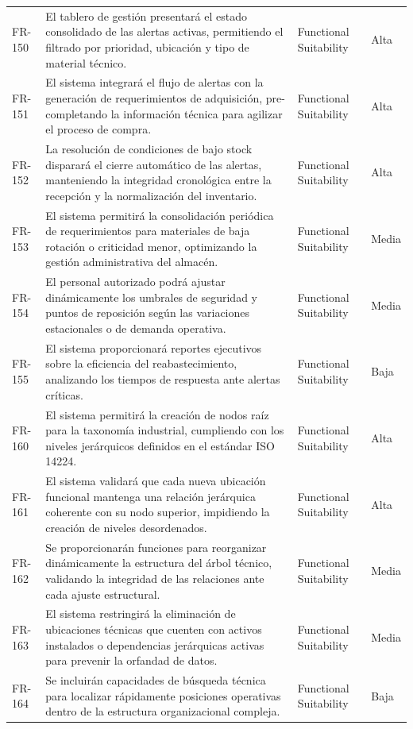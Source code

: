 \begin{longtable}{>{\raggedright\arraybackslash}p{} >{\raggedright\arraybackslash}p{} >{\raggedright\arraybackslash}p{} >{\raggedright\arraybackslash}p{}}
FR-150 & El tablero de gestión presentará el estado consolidado de las alertas activas, permitiendo el filtrado por prioridad, ubicación y tipo de material técnico. & Functional Suitability & Alta \\
FR-151 & El sistema integrará el flujo de alertas con la generación de requerimientos de adquisición, pre-completando la información técnica para agilizar el proceso de compra. & Functional Suitability & Alta \\
FR-152 & La resolución de condiciones de bajo stock disparará el cierre automático de las alertas, manteniendo la integridad cronológica entre la recepción y la normalización del inventario. & Functional Suitability & Alta \\
FR-153 & El sistema permitirá la consolidación periódica de requerimientos para materiales de baja rotación o criticidad menor, optimizando la gestión administrativa del almacén. & Functional Suitability & Media \\
FR-154 & El personal autorizado podrá ajustar dinámicamente los umbrales de seguridad y puntos de reposición según las variaciones estacionales o de demanda operativa. & Functional Suitability & Media \\
FR-155 & El sistema proporcionará reportes ejecutivos sobre la eficiencia del reabastecimiento, analizando los tiempos de respuesta ante alertas críticas. & Functional Suitability & Baja \\
FR-160 & El sistema permitirá la creación de nodos raíz para la taxonomía industrial, cumpliendo con los niveles jerárquicos definidos en el estándar ISO 14224. & Functional Suitability & Alta \\
FR-161 & El sistema validará que cada nueva ubicación funcional mantenga una relación jerárquica coherente con su nodo superior, impidiendo la creación de niveles desordenados. & Functional Suitability & Alta \\
FR-162 & Se proporcionarán funciones para reorganizar dinámicamente la estructura del árbol técnico, validando la integridad de las relaciones ante cada ajuste estructural. & Functional Suitability & Media \\
FR-163 & El sistema restringirá la eliminación de ubicaciones técnicas que cuenten con activos instalados o dependencias jerárquicas activas para prevenir la orfandad de datos. & Functional Suitability & Media \\
FR-164 & Se incluirán capacidades de búsqueda técnica para localizar rápidamente posiciones operativas dentro de la estructura organizacional compleja. & Functional Suitability & Baja \\

\end{longtable}
